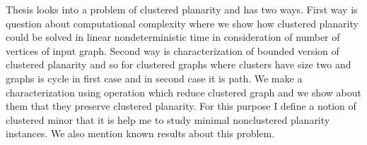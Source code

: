 Thesis looks into a problem of clustered planarity and has two ways. First way is question about computational complexity where we show how clustered planarity could be solved in linear nondeterministic time in consideration of number of vertices of input graph. Second way is characterization of bounded version of clustered planarity and so for clustered graphs where clusters have size two and graphs is cycle in first case and in second case it is path. We make a characterization using operation which reduce clustered graph and we show about them that they preserve clustered planarity. For this purpose I define a notion of clustered minor that it is help me to study minimal nonclustered planarity instances. We also mention known results about this problem.